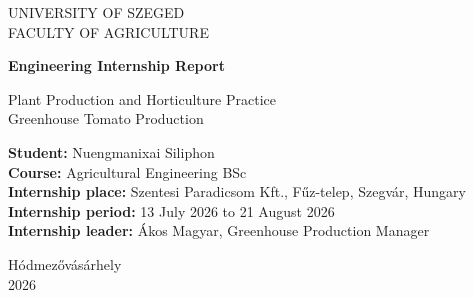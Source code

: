 \begin{titlepage}
\centering
\vspace*{1cm}

{\large UNIVERSITY OF SZEGED\\FACULTY OF AGRICULTURE\par}

\vspace{2cm}

{\Huge\bfseries Engineering Internship Report\par}

\vspace{0.5cm}

{\Large Plant Production and Horticulture Practice\\
Greenhouse Tomato Production\par}

\vspace{3cm}

\begin{flushleft}
\Large
\textbf{Student:} Nuengmanixai Siliphon\\[6pt]
\textbf{Course:} Agricultural Engineering BSc\\[6pt]
\textbf{Internship place:} Szentesi Paradicsom Kft., Fűz-telep, Szegvár, Hungary\\[6pt]
\textbf{Internship period:} 13 July 2026 to 21 August 2026\\[6pt]
\textbf{Internship leader:} Ákos Magyar, Greenhouse Production Manager\\
\end{flushleft}

\vfill

{\large Hódmezővásárhely\\2026\par}

\end{titlepage}
